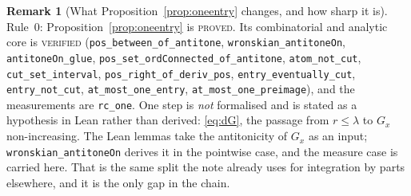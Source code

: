 \documentclass[11pt]{article}
\theoremstyle{definition}
\newtheorem{remark}[theorem]{Remark}
\begin{document}
\begin{remark}[What Proposition~\ref{prop:oneentry} changes, and how sharp it is]
Rule~0: Proposition~\ref{prop:oneentry} is \textsc{proved}. Its combinatorial and analytic
core is \textsc{verified} (\verb|pos_between_of_antitone|, \verb|wronskian_antitoneOn|,
\verb|antitoneOn_glue|, \verb|pos_set_ordConnected_of_antitone|, \verb|atom_not_cut|,
\verb|cut_set_interval|, \verb|pos_right_of_deriv_pos|, \verb|entry_eventually_cut|,
\verb|entry_not_cut|, \verb|at_most_one_entry|, \verb|at_most_one_preimage|), and the
measurements are \verb|rc_one|. One step is \emph{not} formalised and is stated as a
hypothesis in Lean rather than derived: \eqref{eq:dG}, the passage from $r\le\lambda$ to
$G_x$ non-increasing. The Lean lemmas take the antitonicity of $G_x$ as an input;
\verb|wronskian_antitoneOn| derives it in the pointwise case, and the measure case is carried
here. That is the same split the note already uses for integration by parts elsewhere, and it
is the only gap in the chain.
\end{remark}
\end{document}
